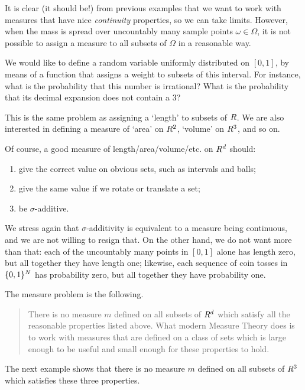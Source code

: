 \documentclass[
]{book}
\theoremstyle{definition}
\theoremstyle{remark}
\let\mathbb\relax %
\newcommand{\N}{\mathbb{N}}
\newcommand{\R}{\mathbb{R}}
\begin{document}
It is clear (it should be!) from previous examples that we want to work
with measures that have nice \emph{continuity} properties, so we can take
limits. However, when the mass is spread over uncountably many sample
points \(\omega \in \Omega\), it is not possible to assign a measure to
all subsets of \(\Omega\) in a reasonable way.

We would like to define a random variable uniformly distributed on
\([0,1]\), by means of a function that assigns a weight to subsets of this
interval. For instance, what is the probability that this number is
irrational? What is the probability that its decimal expansion does not
contain a 3?

This is the same problem as assigning a `length' to subsets of \(\R\). We
are also interested in defining a measure of `area' on \(\R^2\), `volume'
on \(\R^3\), and so on.

Of course, a good measure of length/area/volume/etc. on \(\R^d\) should:

\begin{enumerate}
\def\labelenumi{\arabic{enumi}.}
\item
  give the correct value on obvious sets, such as intervals and balls;
\item
  give the same value if we rotate or translate a set;
\item
  be \(\sigma\)-additive.
\end{enumerate}

We stress again that \(\sigma\)-additivity is equivalent to a measure being
continuous, and we are not willing to resign that. On the other hand, we
do not want more than that: each of the uncountably many points in
\([0,1]\) alone has length zero, but all together they have length one;
likewise, each sequence of coin tosses in \(\{0,1\}^{\N}\) has probability
zero, but all together they have probability one.

The measure problem is the following.

\begin{quote}
There is no measure \(m\) defined on all subsets of \(\R^d\) which satisfy
all the reasonable properties listed above. What modern Measure Theory
does is to work with measures that are defined on a class of sets which
is large enough to be useful and small enough for these properties to
hold.
\end{quote}

The next example shows that there is no measure \(m\) defined on all
subsets of \(\R^3\) which satisfies these three properties.
\end{document}

